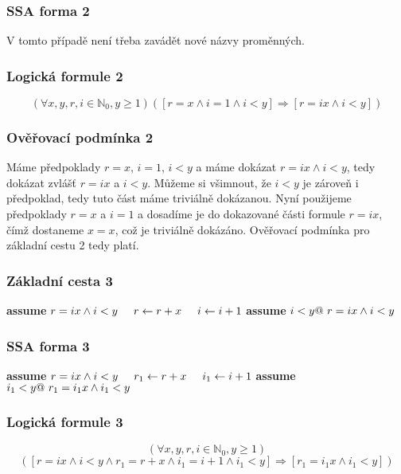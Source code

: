 \documentclass{article}
\newcommand\tab[1][0.5cm]{\hspace*{#1}}
\newcommand{\N}{\mathbb{N}}
\begin{document}
\subsubsection{SSA forma 2}
V tomto případě není třeba zavádět nové názvy proměnných.

\subsubsection{Logická formule 2}
$$(\forall x,y,r,i \in \N_0, y \geq 1)([r = x \wedge i = 1 \wedge i < y] \Rightarrow [r = ix \wedge i < y]  )$$

\subsubsection{Ověřovací podmínka 2}
Máme předpoklady $r = x$, $i = 1$, $i < y$ a máme dokázat $r = ix \wedge i < y$, tedy dokázat zvlášť $r = ix$ a $i < y$. Můžeme si všimnout, že $i < y$ je zároveň i předpoklad, tedy tuto část máme triviálně dokázanou. Nyní použijeme předpoklady $r = x$ a $ i = 1$ a dosadíme je do dokazované části formule $r = ix$, čímž dostaneme $x = x$, což je triviálně dokázáno. Ověřovací podmínka pro základní cestu 2 tedy platí.

\subsubsection{Základní cesta 3}
\textbf{assume} $r = ix \wedge i < y \newline \tab r \leftarrow r + x \newline \tab i \leftarrow i + 1 \newline$ \textbf{assume} $i < y \newline @\ r = ix \wedge i < y$  

\subsubsection{SSA forma 3}
\textbf{assume} $r = ix \wedge i < y \newline \tab r_1 \leftarrow r + x \newline \tab i_1 \leftarrow i + 1 \newline$ \textbf{assume} $i_1 < y \newline @\ r_1 = i_1x \wedge i_1 < y$  

\subsubsection{Logická formule 3}
$$(\forall x,y,r,i \in \N_0, y \geq 1)$$ $$([r = ix \wedge i < y \wedge r_1 = r + x \wedge i_1 = i + 1 \wedge i_1 < y] \Rightarrow [r_1 = i_1x \wedge i_1 < y]  )$$
\end{document}
